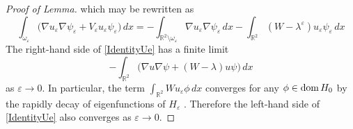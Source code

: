 \documentclass[reqno]{amsart}
\theoremstyle{plain}
\numberwithin{equation}{section}
\newcommand{\dom}{\mathop{\rm dom}}
\newcommand{\Real}{\mathbb R}
\newcommand{\eps}{\varepsilon}
\begin{document}
\begin{proof}[Proof of Lemma]
  which may be rewritten as
\begin{equation}\label{IdentityUe}
   \int_{\omega_\eps}\big(\nabla u_\eps \nabla \psi_\eps+
   V_\eps u_\eps \psi_\eps\big)\,dx=
    -\int_{\Real^2\setminus\omega_\eps}\nabla u_\eps \nabla \psi_\eps\,dx- \int_{\Real^2}
              (W-\lambda^\eps)u_\eps \psi_\eps\,dx
\end{equation}
The right-hand side of \eqref{IdentityUe} has a finite limit
\begin{equation*}
  -\int_{\Real^2}\big(\nabla u \nabla \psi+
              (W-\lambda)u \psi\big)\,dx
\end{equation*}
as $\eps\to 0$. In particular, the term $\int_{\Real^2}Wu_\eps \phi\,dx$ converges  for any  $\phi\in \dom H_0$ by the rapidly decay of  eigenfunctions of $H_\eps$ \cite[Ch.3.3]{BerezinShubinBook}. Therefore the left-hand side of \eqref{IdentityUe} also converges as $\eps\to 0$.



\end{proof}
\end{document}
